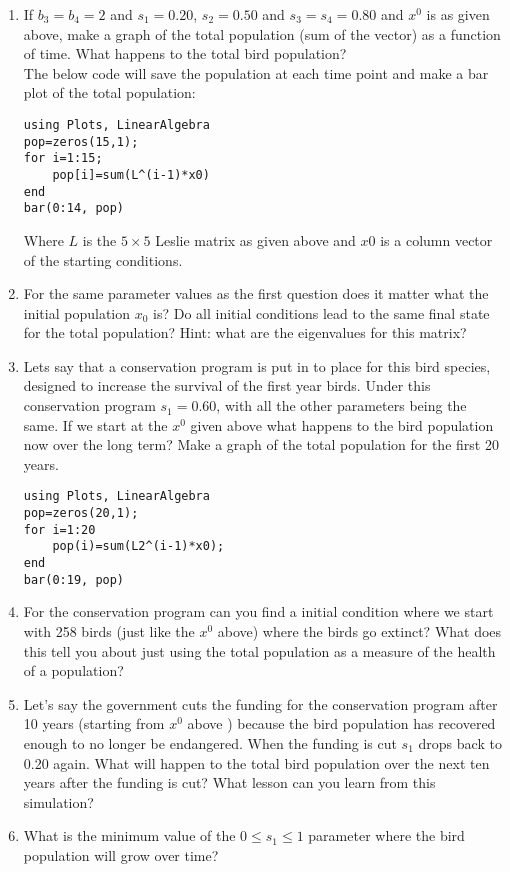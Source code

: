 \documentclass[11pt, a4paper]{article}
\begin{document}
\begin{enumerate}
\begin{enumerate}
\item If $b_3=b_4=2$ and $s_1=0.20$, $s_2=0.50$ and $s_3=s_4=0.80$ and $x^0$ is as given above, make a graph of the total population (sum of the vector) as a function of time. What happens to the total bird population? \\
The below code will save the population at each time point and make a bar plot of the total population:
\begin{lstlisting}
using Plots, LinearAlgebra
pop=zeros(15,1);
for i=1:15; 
	pop[i]=sum(L^(i-1)*x0)
end
bar(0:14, pop)
\end{lstlisting}
Where $L$ is the $5 \times 5$ Leslie matrix as given above and $x0$ is a column vector of the starting conditions. 
\item For the same parameter values as the first question does it matter what the initial population $x_0$ is? Do all initial conditions lead to the same final state for the total population? Hint: what are the eigenvalues for this matrix?
\item Lets say that a conservation program is put in to place for this bird species, designed to increase the survival of the first year birds. Under this conservation program $s_1=0.60$, with all the other parameters being the same. If we start at the $x^0$ given above what happens to the bird population now over the long term? Make a graph of the total population for the first 20 years.
\begin{lstlisting}
using Plots, LinearAlgebra
pop=zeros(20,1);
for i=1:20
	pop(i)=sum(L2^(i-1)*x0); 
end
bar(0:19, pop)
\end{lstlisting}
\item For the conservation program can you find a initial condition where we start with 258 birds (just like the $x^0$ above) where the birds go extinct? What does this tell you about just using the total population as a measure of the health of a population?
\item Let's say the government cuts the funding for the conservation program after 10 years (starting from $x^0$ above ) because the bird population has recovered enough to no longer be endangered. When the funding is cut $s_1$ drops back to 0.20 again. What will happen to the total bird population over the next ten years after the funding is cut? What lesson can you learn from this simulation? 
\item What is the minimum value of the $0 \leq s_1 \leq 1$ parameter where the bird population will grow over time? 
\end{enumerate}


\end{enumerate}
\end{document}
